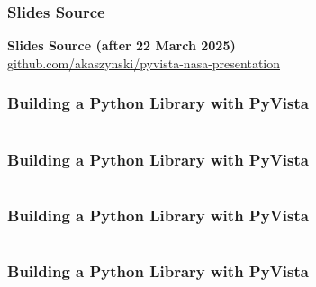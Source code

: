 \documentclass[t]{beamer}
\renewcommand{\footnotesize}{\scriptsize}
\begin{document}
\begin{frame}
    \frametitle{Slides Source}

    \centering
    \textbf{Slides Source (after 22 March 2025)} \\[10pt]
    \href{https://github.com/akaszynski/pyvista-nasa-presentation}{github.com/akaszynski/pyvista-nasa-presentation} \\[10pt]

\end{frame}



\begin{frame}

    \frametitle{Building a Python Library with PyVista}
    \inputminted[fontsize=\footnotesize]{python}{code/hecc-0.py}

\end{frame}

\begin{frame}

    \frametitle{Building a Python Library with PyVista}

    \inputminted[fontsize=\footnotesize]{toml}{code/pyminiply-pyproject.toml}

\end{frame}

\begin{frame}

    \frametitle{Building a Python Library with PyVista}

    \inputminted[fontsize=\footnotesize]{cpp}{code/pyminiply.cpp}

\end{frame}

\begin{frame}

    \frametitle{Building a Python Library with PyVista}

    \inputminted[fontsize=\tiny]{python}{code/pyminiply.py}

\end{frame}
\end{document}
